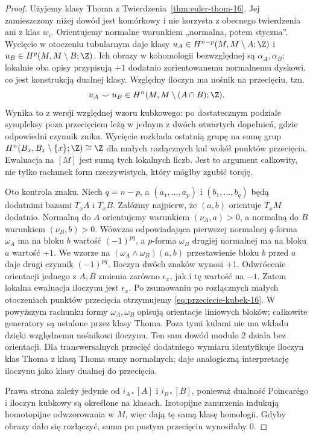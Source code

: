 \begin{proof}
Użyjemy klasy Thoma z Twierdzenia~\ref{thm:euler-thom-16}.
Jej zamieszczony niżej dowód jest komórkowy i nie
korzysta z obecnego twierdzenia ani z klas $w_i$.
Orientujemy normalne warunkiem „normalna, potem styczna”.
Wycięcie w otoczeniu tubularnym daje klasy
$u_A\in H^{n-p}(M,M\setminus A;\Z)$ i
$u_B\in H^p(M,M\setminus B;\Z)$.
Ich obrazy w kohomologii bezwzględnej są $\alpha_A,\alpha_B$:
lokalnie oba opisy przypisują $+1$ dodatnio zorientowanemu
normalnemu dyskowi, co jest konstrukcją dualnej klasy.
Względny iloczyn ma nośnik na przecięciu, tzn.
\[
 u_A\smile u_B\in H^n(M,M\setminus(A\cap B);\Z).
\]
Wynika to z wersji względnej wzoru kubkowego:
po dostatecznym podziale sympleksy poza przecięciem
leżą w jednym z dwóch otwartych dopełnień,
gdzie odpowiedni czynnik znika.
Wycięcie rozkłada ostatnią grupę na sumę grup
$H^n(B_x,B_x\setminus\{x\};\Z)\cong\Z$
dla małych rozłącznych kul wokół punktów przecięcia.
Ewaluacja na $[M]$ jest sumą tych lokalnych liczb.
Jest to argument całkowity, nie tylko rachunek form
rzeczywistych, który mógłby zgubić torsję.

Oto kontrola znaku.
Niech $q=n-p$, a
$(a_1,\ldots,a_p)$
i $(b_1,\ldots,b_q)$
będą dodatnimi
bazami $T_xA$ i $T_xB$.
Załóżmy najpierw,
że $(a,b)$ orientuje
$T_xM$ dodatnio.
Normalną do $A$
orientujemy warunkiem
$(\nu_A,a)>0$,
a normalną do $B$
warunkiem
$(\nu_B,b)>0$.
Wówczas odpowiadająca
pierwszej normalnej
$q$-forma $\omega_A$
ma na bloku $b$
wartość $(-1)^{pq}$,
a $p$-forma $\omega_B$
drugiej normalnej
ma na bloku $a$
wartość $+1$.
We wzorze na
$(\omega_A\wedge\omega_B)(a,b)$
przestawienie bloku
$b$ przed $a$
daje drugi czynnik
$(-1)^{pq}$.
Iloczyn dwóch znaków
wynosi $+1$.
Odwrócenie orientacji
jednego z $A,B$
zmienia zarówno
$\epsilon_x$, jak
i tę wartość na $-1$.
Zatem lokalna ewaluacja
iloczynu jest $\epsilon_x$.
Po zsumowaniu po rozłącznych
małych otoczeniach punktów
przecięcia otrzymujemy
\eqref{eq:przeciecie-kubek-16}.
W powyższym rachunku formy $\omega_A,\omega_B$
opisują orientacje liniowych bloków; całkowite
generatory są ustalone przez klasy Thoma.
Poza tymi kulami nie ma wkładu dzięki względnemu
nośnikowi iloczynu. Ten sam dowód modulo $2$
działa bez orientacji. Dla transwersalnych przecięć
dodatniego wymiaru identyfikuje iloczyn klas Thoma
z klasą Thoma sumy normalnych; daje analogiczną
interpretację iloczynu jako klasy dualnej do przecięcia.

Prawa strona zależy jedynie
od $i_{A*}[A]$ i $i_{B*}[B]$,
ponieważ dualność Poincarégo
i iloczyn kubkowy są
określone na klasach.
Izotopijne zanurzenia
indukują homotopijne
odwzorowania w $M$,
więc dają tę samą
klasę homologii.
Gdyby obrazy dało się
rozłączyć, suma po
pustym przecięciu
wynosiłaby $0$.
\end{proof}

